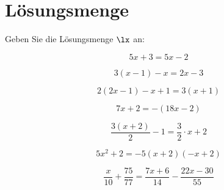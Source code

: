 
\section{Lösungsmenge}
Geben Sie die Lösungsmenge $\lx$ an:

\begin{bbwAufgabenBlock}

\item $$5x+3 = 5x-2$$
\LoesungsBlock{$\lx=\{\}$}

\item $$3(x-1)-x = 2x-3$$

\item $$2(2x-1)-x+1 = 3(x+1)$$
\LoesungsBlock{$\lx=\{\}$}

\item $$7x+2 = -(18x - 2)$$

\item $$\frac{3(x+2)}2 - 1 = \frac32 \cdot{} x + 2$$

\item $$5x^2 + 2 = -5(x+2)(-x+2)$$
\LoesungsBlock{$\lx=\{\}$}

\item $$\frac{x}{10} + \frac{75}{77} = \frac{7x+6}{14} - \frac{22x-30}{55}$$

\end{bbwAufgabenBlock}
\newpage
